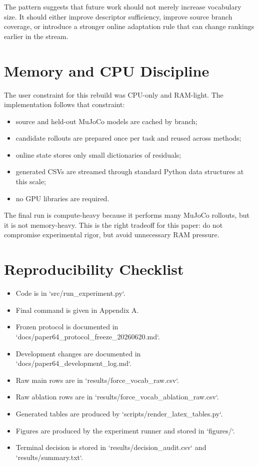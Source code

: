 \documentclass{article}
\begin{document}
The pattern suggests that future work should not merely increase vocabulary size. It should either improve descriptor sufficiency, improve source branch coverage, or introduce a stronger online adaptation rule that can change rankings earlier in the stream.

\section{Memory and CPU Discipline}

The user constraint for this rebuild was CPU-only and RAM-light. The implementation follows that constraint:

\begin{itemize}
\item source and held-out MuJoCo models are cached by branch;
\item candidate rollouts are prepared once per task and reused across methods;
\item online state stores only small dictionaries of residuals;
\item generated CSVs are streamed through standard Python data structures at this scale;
\item no GPU libraries are required.
\end{itemize}

The final run is compute-heavy because it performs many MuJoCo rollouts, but it is not memory-heavy. This is the right tradeoff for this paper: do not compromise experimental rigor, but avoid unnecessary RAM pressure.

\section{Reproducibility Checklist}

\begin{itemize}
\item Code is in `src/run\_experiment.py`.
\item Final command is given in Appendix A.
\item Frozen protocol is documented in `docs/paper64\_protocol\_freeze\_20260620.md`.
\item Development changes are documented in `docs/paper64\_development\_log.md`.
\item Raw main rows are in `results/force\_vocab\_raw.csv`.
\item Raw ablation rows are in `results/force\_vocab\_ablation\_raw.csv`.
\item Generated tables are produced by `scripts/render\_latex\_tables.py`.
\item Figures are produced by the experiment runner and stored in `figures/`.
\item Terminal decision is stored in `results/decision\_audit.csv` and `results/summary.txt`.
\end{itemize}
\end{document}
